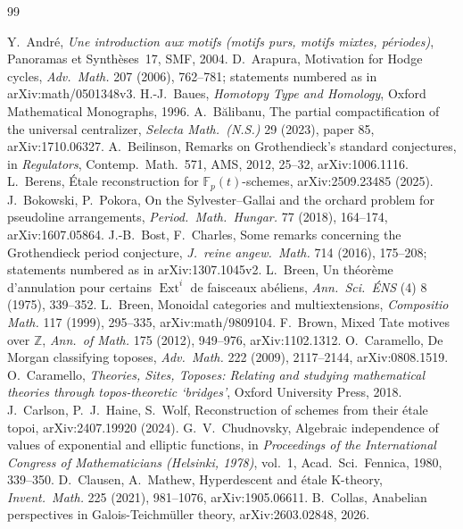 \documentclass[11pt]{article}
\newcommand{\Ext}{\operatorname{Ext}}
\theoremstyle{definition}
\theoremstyle{plain}\newtheorem*{proposition}{Proposition}\theoremstyle{definition}
\begin{document}
\begin{thebibliography}{99}

 Y.~André, \emph{Une introduction aux motifs (motifs purs, motifs mixtes, périodes)}, Panoramas et Synthèses~17, SMF, 2004.
 D.~Arapura, Motivation for Hodge cycles, \emph{Adv.\ Math.} 207 (2006), 762--781; statements numbered as in arXiv:math/0501348v3.
 H.-J.~Baues, \emph{Homotopy Type and Homology}, Oxford Mathematical Monographs, 1996.
 A.~Bălibanu, The partial compactification of the universal centralizer, \emph{Selecta Math.\ (N.S.)} 29 (2023), paper 85, arXiv:1710.06327.
 A.~Beilinson, Remarks on Grothendieck's standard conjectures, in \emph{Regulators}, Contemp.\ Math.~571, AMS, 2012, 25--32, arXiv:1006.1116.
 L.~Berens, Étale reconstruction for $\mathbb F_p(t)$-schemes, arXiv:2509.23485 (2025).
 J.~Bokowski, P.~Pokora, On the Sylvester--Gallai and the orchard problem for pseudoline arrangements, \emph{Period.\ Math.\ Hungar.} 77 (2018), 164--174, arXiv:1607.05864.
 J.-B.~Bost, F.~Charles, Some remarks concerning the Grothendieck period conjecture, \emph{J.\ reine angew.\ Math.} 714 (2016), 175--208; statements numbered as in arXiv:1307.1045v2.
 L.~Breen, Un théorème d'annulation pour certains $\Ext^i$ de faisceaux abéliens, \emph{Ann.\ Sci.\ ÉNS} (4) 8 (1975), 339--352.
 L.~Breen, Monoidal categories and multiextensions, \emph{Compositio Math.} 117 (1999), 295--335, arXiv:math/9809104.
 F.~Brown, Mixed Tate motives over $\mathbb Z$, \emph{Ann.\ of Math.} 175 (2012), 949--976, arXiv:1102.1312.
 O.~Caramello, De Morgan classifying toposes, \emph{Adv.\ Math.} 222 (2009), 2117--2144, arXiv:0808.1519.
 O.~Caramello, \emph{Theories, Sites, Toposes: Relating and studying mathematical theories through topos-theoretic `bridges'}, Oxford University Press, 2018.
 J.~Carlson, P.~J.~Haine, S.~Wolf, Reconstruction of schemes from their étale topoi, arXiv:2407.19920 (2024).
 G.~V.~Chudnovsky, Algebraic independence of values of exponential and elliptic functions, in \emph{Proceedings of the International Congress of Mathematicians (Helsinki, 1978)}, vol.~1, Acad.\ Sci.\ Fennica, 1980, 339--350.
 D.~Clausen, A.~Mathew, Hyperdescent and étale K-theory, \emph{Invent.\ Math.} 225 (2021), 981--1076, arXiv:1905.06611.
 B.~Collas, Anabelian perspectives in Galois-Teichmüller theory, arXiv:2603.02848, 2026.

\end{thebibliography}
\end{document}
